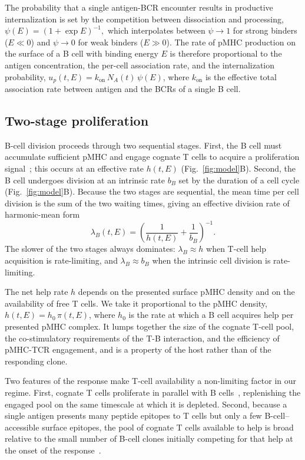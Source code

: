 \documentclass[aps, pre, twocolumn, 10pt, groupedaddress, superscriptaddress, linenumbers]{revtex4-2}
\newcommand{\EQ}{\begin{equation}}
\newcommand{\EE}{\end{equation}}
\newcommand{\on}{\text{on}}
\newcommand{\DG}{E}
\newcommand{\lam}{\lambda}
\begin{document}
The probability that a single antigen-BCR encounter results in productive internalization is set by the competition between dissociation and processing, $\psi(\DG) = \left(1+\exp{\DG}\right)^{-1},$ which interpolates between $\psi \to 1$ for strong binders ($\DG \ll 0$) and $\psi \to 0$ for weak binders ($\DG \gg 0$).
The rate of pMHC production on the surface of a B cell with binding energy $\DG$ is therefore proportional to the antigen concentration, the per-cell association rate, and the internalization probability, $u_p(t, \DG) = k_\on\, N_A(t)\, \psi(\DG)$, where $k_\on$ is the effective total association rate between antigen and the BCRs of a single B cell.

\subsection*{Two-stage proliferation}
B-cell division proceeds through two sequential stages.
First, the B cell must accumulate sufficient pMHC and engage cognate T cells to acquire a proliferation signal~\cite{Schwickert_2011_Tcells}; this occurs at an effective rate $h(t, \DG)$ (Fig.~\ref{fig:model}B).
Second, the B cell undergoes division at an intrinsic rate $b_B$ set by the duration of a cell cycle (Fig.~\ref{fig:model}B).
Because the two stages are sequential, the mean time per cell division is the sum of the two waiting times, giving an effective division rate of harmonic-mean form
\EQ
\lam_B(t, \DG) = \left(\frac{1}{h(t, \DG)} + \frac{1}{b_B}\right)^{-1}.
\label{eq:lambdaB}
\EE
The slower of the two stages always dominates: $\lam_B \approx h$ when T-cell help acquisition is rate-limiting, and $\lam_B \approx b_B$ when the intrinsic cell division is rate-limiting.

The net help rate $h$ depends on the presented surface pMHC density and on the availability of free T cells.
We take it proportional to the pMHC density, $h(t, \DG) = h_0\,\pi(t, \DG)$, where $h_0$ is the rate at which a B cell acquires help per presented pMHC complex.
It lumps together the size of the cognate T-cell pool, the co-stimulatory requirements of the T-B interaction, and the efficiency of pMHC-TCR engagement, and is a property of the host rather than of the responding clone.

Two features of the response make T-cell availability a non-limiting factor in our regime.
First, cognate T cells proliferate in parallel with B cells~\cite{garsideVisualizationSpecificLymphocyte1998}, replenishing the engaged pool on the same timescale at which it is depleted.
Second, because a single antigen presents many peptide epitopes to T cells but only a few B-cell–accessible surface epitopes, the pool of cognate T cells available to help is broad relative to the small number of B-cell clones initially competing for that help at the onset of the response~\cite{besavillaPreexistingCD4Cell2023}.
\end{document}
